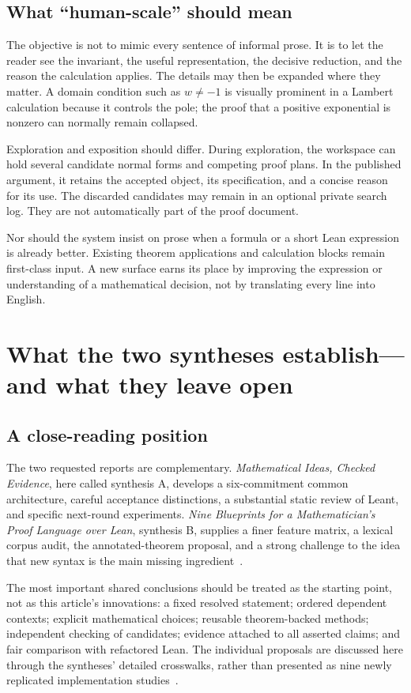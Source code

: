 \documentclass[11pt,a4paper]{article}
\theoremstyle{remark}
\begin{document}
\subsection{What ``human-scale'' should mean}
The objective is not to mimic every sentence of informal prose. It is to let the
reader see the invariant, the useful representation, the decisive reduction, and
the reason the calculation applies. The details may then be expanded where they
matter. A domain condition such as $w\ne-1$ is visually prominent in a Lambert
calculation because it controls the pole; the proof that a positive exponential
is nonzero can normally remain collapsed.

Exploration and exposition should differ. During exploration, the workspace can
hold several candidate normal forms and competing proof plans. In the published
argument, it retains the accepted object, its specification, and a concise reason
for its use. The discarded candidates may remain in an optional private search
log. They are not automatically part of the proof document.

Nor should the system insist on prose when a formula or a short Lean expression
is already better. Existing theorem applications and calculation blocks remain
first-class input. A new surface earns its place by improving the expression or
understanding of a mathematical decision, not by translating every line into
English.

\section{What the two syntheses establish---and what they leave open}
\label{sec:reading}
\subsection{A close-reading position}
The two requested reports are complementary. \emph{Mathematical Ideas, Checked
Evidence}, here called synthesis A, develops a six-commitment common architecture,
careful acceptance distinctions, a substantial static review of Leant, and
specific next-round experiments. \emph{Nine Blueprints for a Mathematician's Proof
Language over Lean}, synthesis B, supplies a finer feature matrix, a lexical
corpus audit, the annotated-theorem proposal, and a strong challenge to the idea
that new syntax is the main missing ingredient~\cite{synA,synB}.

The most important shared conclusions should be treated as the starting point,
not as this article's innovations: a fixed resolved statement; ordered dependent
contexts; explicit mathematical choices; reusable theorem-backed methods;
independent checking of candidates; evidence attached to all asserted claims;
and fair comparison with refactored Lean. The individual proposals are discussed
here through the syntheses' detailed crosswalks, rather than presented as nine
newly replicated implementation studies~\cite{synA,synB}.
\end{document}
